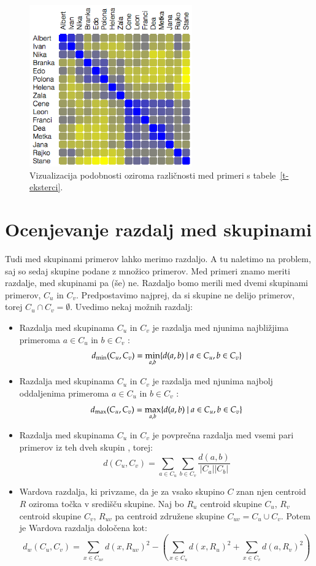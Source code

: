 \begin{figure}[htbp]
\begin{center}
\includegraphics[width=7cm]{slike/toplotna-karta.png}
\caption{Vizualizacija podobnosti oziroma različnosti med primeri s
  tabele~\ref{t-eksterci}.}
\label{f-toplotna-karta}
\end{center}
\end{figure}

\section{Ocenjevanje razdalj med skupinami}

Tudi med skupinami primerov lahko merimo razdaljo. A tu naletimo na
problem, saj so sedaj skupine podane z množico primerov. Med primeri
znamo meriti razdalje, med skupinami pa (še) ne. Razdaljo bomo merili
med dvemi skupinami primerov, $C_u$ in $C_v$. Predpostavimo najprej,
da si skupine ne delijo primerov, torej $C_u\cap
C_v=\emptyset$. Uvedimo nekaj možnih razdalj:
\begin{itemize}
\item Razdalja med skupinama $C_u$ in $C_v$ je razdalja med njunima
  najbližjima primeroma $a\in C_u$ in $b\in C_v$ :
$$d_{\rm min}(C_u, C_v)=\min_{a,b}\{d(a,b)\ |\ a\in C_u, b\in C_v\}$$
\item Razdalja med skupinama $C_u$ in $C_v$ je razdalja med njunima
  najbolj oddaljenima primeroma $a\in C_u$ in $b\in C_v$
  :
$$d_{\rm max}(C_u, C_v)=\max_{a,b}\{d(a,b)\ |\ a\in C_u, b\in C_v\}$$
\item Razdalja med skupinama $C_u$ in $C_v$ je povprečna razdalja med
  vsemi pari primerov iz teh dveh skupin , torej:
$$d(C_u, C_v)={\sum_{a\in C_u}\sum_{b\in C_v}  \frac{d(a,b)}{|C_a||C_b|}} $$
\item Wardova razdalja, ki privzame, da je za vsako skupino $C$ znan
  njen centroid $R$ oziroma točka v središču skupine. Naj bo $R_u$
  centroid skupine $C_u$, $R_v$
  centroid skupine $C_v$, $R_{uv}$ pa centroid združene skupine
  $C_{uv}=C_u\cup C_v$. Potem je Wardova razdalja določena kot:
$$d_w(C_u, C_v)=\sum_{x\in C_{uv}}d(x, R_{uv})^2 - (\sum_{x\in
    C_u}d(x, R_u)^2 + \sum_{x\in C_v}d(a, R_v)^2)$$
\end{itemize}

